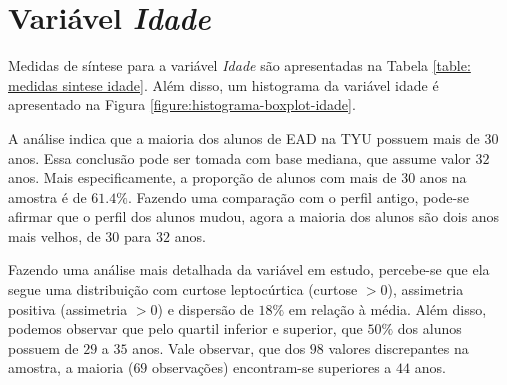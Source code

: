 \documentclass[10pt,a4paper,oneside]{article}
\begin{document}
\FloatBarrier
\clearpage
\section{Variável \textit{Idade}}
\label{section:idade}

Medidas de síntese para a variável \textit{Idade} são apresentadas na Tabela \ref{table: medidas sintese idade}. Além disso, um histograma da variável idade é apresentado na Figura \ref{figure:histograma-boxplot-idade}.

A análise indica que a maioria dos alunos de EAD na TYU possuem mais de $30$ anos. Essa conclusão pode ser tomada com base mediana, que assume valor $32$ anos. Mais especificamente, a proporção de alunos com mais de 30 anos na amostra é de $61.4\%$. Fazendo uma comparação com o perfil antigo, pode-se afirmar que o perfil dos alunos mudou, agora a maioria dos alunos são dois anos mais velhos, de $30$ para $32$ anos.

Fazendo uma análise mais detalhada da variável em estudo, percebe-se que ela segue uma distribuição com curtose leptocúrtica (curtose $> 0$), assimetria positiva (assimetria $> 0$) e dispersão de $18\%$ em relação à média. Além disso, podemos observar que pelo quartil inferior e superior, que $50\%$  dos alunos possuem de $29$ a $35$ anos. Vale observar, que dos $98$ valores discrepantes na amostra, a maioria ($69$ observações) encontram-se superiores a $44$ anos.
\end{document}
